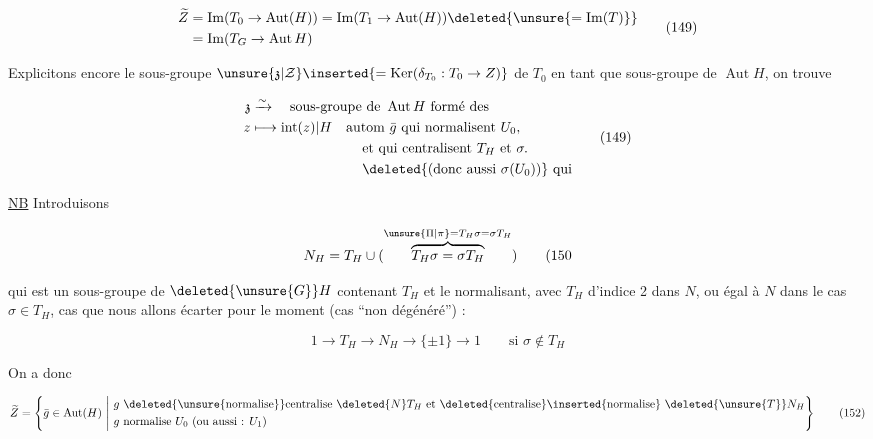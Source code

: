 \[
\begin{aligned}
\widetilde Z &=\operatorname{Im}(T_0\to\operatorname{Aut}(H))=\operatorname{Im}(T_1\to\operatorname{Aut}(H))\deleted{\unsure{=\operatorname{Im}(T)}}\\
&=\operatorname{Im}(T_G\to\operatorname{Aut} H)
\end{aligned}\tag*{(149)}
\]

 Explicitons encore le sous-groupe $\unsure{\mathfrak z|\mathcal Z}\inserted{=\operatorname{Ker}(\delta_{T_0}:T_0\to Z)}$ de $T_0$ en tant que sous-groupe de $\operatorname{Aut} H$, on trouve 

\[
\begin{aligned}
\mathfrak z&\xrightarrow{\sim}\quad\text{sous-groupe de }\operatorname{Aut}H\ \text{formé des}\\
z&\longmapsto\operatorname{int}(z)|H\quad \text{autom }\bar g\ \text{qui normalisent }U_0,\\
&\hspace{8em}\text{et qui centralisent }T_H\ \text{et }\sigma.\\
&\hspace{8em}\deleted{\text{(donc aussi }\sigma(U_0)\text{)}}\ \text{qui}
\end{aligned}\tag*{(149)}
\]

\uline{NB} Introduisons

\[
N_H=T_H\cup(\overbrace{T_H\sigma=\sigma T_H}^{\unsure{\Pi|\pi}=T_H\sigma=\sigma T_H})\tag*{(150}
\]

qui est un sous-groupe de $\deleted{\unsure{G}}H$  contenant $T_H$ et le normalisant, avec $T_H$ d'indice 2 dans $N$, ou égal à $N$ dans le cas $\sigma\in T_H$,  cas  que nous allons écarter pour le moment (cas ``non dégénéré'') :

\[
1\longrightarrow T_H\longrightarrow N_H\longrightarrow\{\pm1\}\longrightarrow1
\qquad\text{si }\sigma\notin T_H\tag*{(151)}
\]

On a donc

\[
\widetilde Z=\left\{\bar g\in\operatorname{Aut}(H)\ \middle|\
\begin{aligned}
&g\ \deleted{\unsure{\text{normalise}}}\text{centralise }\deleted{N}T_H\ \text{et }\deleted{\text{centralise}}\inserted{\text{normalise}}\ \deleted{\unsure{T}}N_H\\
&g\ \text{normalise }U_0\ \text{(ou aussi : }U_1\text{)}
\end{aligned}\right\}\tag*{(152)}
\]

